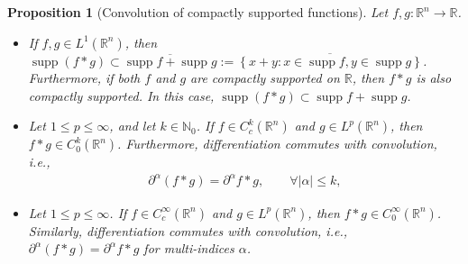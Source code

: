 \documentclass{article}
\numberwithin{equation}{section}
\DeclareMathOperator{\supp}{supp}
\theoremstyle{plain}
\newtheorem{proposition}[theorem]{Proposition}
\theoremstyle{definition}
\begin{document}
\begin{proposition}[Convolution of compactly supported functions]\label{prop:1.4}
Let $f,g:\mathbb{R}^n\to\mathbb{R}$.
\begin{itemize}
	\item[(i)] If $f,g\in L^1(\mathbb{R}^n)$, then $\supp(f*g)\subset\overline{\supp f + \supp g} := \overline{\left\{x+y:x\in\supp f,y\in\supp g\right\}}$. Furthermore, if both $f$ and $g$ are compactly supported on $\mathbb{R}$, then $f*g$ is also compactly supported. In this case, $\supp(f*g)\subset\supp f + \supp g$.
	\vspace{0.1cm}
	\item[(ii)] Let $1\leq p\leq \infty$, and let $k\in\mathbb{N}_0$. If $f\in C_c^k(\mathbb{R}^n)$ and $g\in L^p(\mathbb{R}^n)$, then $f * g\in C_0^k(\mathbb{R}^n)$. Furthermore, differentiation commutes with convolution, i.e.,
	\begin{align*}
		\partial^\alpha(f*g)=\partial^\alpha f * g,\qquad\forall\vert\alpha\vert\leq k,
	\end{align*}
	\item[(iii)] Let $1\leq p\leq \infty$. If $f\in C_c^\infty(\mathbb{R}^n)$ and $g\in L^p(\mathbb{R}^n)$, then $f * g\in C_0^\infty(\mathbb{R}^n)$. Similarly, differentiation commutes with convolution, i.e., $\partial^\alpha(f * g)=\partial^\alpha f * g$ for multi-indices $\alpha$.
\end{itemize}
\end{proposition}
\end{document}
